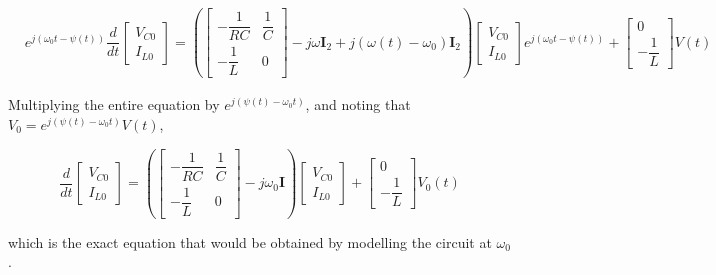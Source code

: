 \begin{example}
\begin{align}
	 & e^{j\left(\omega_0 t - \psi(t)\right)}\dfrac{d}{dt} \left[ \begin{array}{l} V_{C0} \\[3mm] I_{L0} \end{array}\right] = \left(\left[\begin{array}{cc} -\dfrac{1}{RC} & \dfrac{1}{C} \\[5mm] - \dfrac{1}{L} & 0 \end{array}\right] - j\omega \mathbf{I}_2 + j\left(\omega(t) - \omega_0\right) \mathbf{I}_2\right) \left[ \begin{array}{l} V_{C0} \\[3mm] I_{L0} \end{array}\right]e^{j\left(\omega_0 t - \psi(t)\right)} + \left[\begin{array}{c} 0 \\[3mm] -\dfrac{1}{L}\end{array}\right] V(t)  \label{eq:matrix_model_varying_2}
\end{align}

	Multiplying the entire equation by $e^{j\left(\psi(t) - \omega_0 t\right)}$, and noting that $V_0 = e^{j\left(\psi(t) - \omega_0 t\right)}V(t)$,

\begin{equation} \dfrac{d}{dt} \left[ \begin{array}{l} V_{C0} \\[3mm] I_{L0} \end{array}\right] = \left(\left[\begin{array}{cc} -\dfrac{1}{RC} & \dfrac{1}{C} \\[5mm] - \dfrac{1}{L} & 0 \end{array}\right] - j\omega_0 \mathbf{I}\right) \left[ \begin{array}{l} V_{C0} \\[3mm] I_{L0} \end{array}\right] + \left[\begin{array}{c} 0 \\[3mm] -\dfrac{1}{L}\end{array}\right] V_0(t)  \label{eq:matrix_model_varying_3} \end{equation}

	\noindent which is the exact equation that would be obtained by modelling the circuit at $\omega_0$.

\examplebar
\end{example} %

